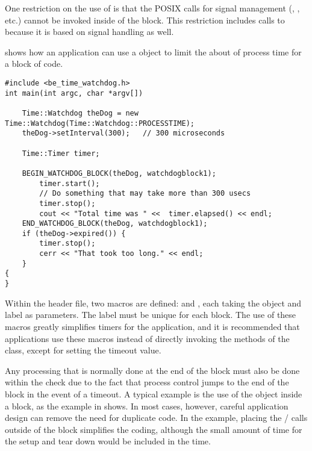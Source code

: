 One restriction on the use of  is that the POSIX calls for
signal management (, , etc.) cannot be
invoked inside of the  block. This restriction includes calls to
 because it is based on signal handling as well.

 shows how an application can use a 
object to limit the about of process time for a block of code.

\begin{lstlisting}[caption={Using the \class{Watchdog}}, label=lst:watchdoguse]
#include <be_time_watchdog.h>
int main(int argc, char *argv[])

    Time::Watchdog theDog = new Time::Watchdog(Time::Watchdog::PROCESSTIME);
    theDog->setInterval(300);	// 300 microseconds

    Time::Timer timer;

    BEGIN_WATCHDOG_BLOCK(theDog, watchdogblock1);
        timer.start();
        // Do something that may take more than 300 usecs
        timer.stop();
        cout << "Total time was " <<  timer.elapsed() << endl;
    END_WATCHDOG_BLOCK(theDog, watchdogblock1);
    if (theDog->expired()) {
        timer.stop();
        cerr << "That took too long." << endl;
    }
{
}
\end{lstlisting}

Within the  header file, two macros are defined:
 and , each taking
the  object and label as parameters. The label must be unique
for each  block.  The use of these macros greatly simplifies
 timers for the application, and it is recommended that applications
use these macros instead of directly invoking the methods of the
 class, except for setting the timeout value.

Any processing that is normally done at the end of the  block must also
be done within the  check
due to the fact that process control jumps to the end of the  block
in the event of a timeout.
A typical example is the use of the 
object inside a  block, as the example in 
shows. In most cases, however, careful application design can remove the need
for duplicate code. In the example, placing the  / calls
outside of the  block simplifies the coding, although the small amount
of time for the  setup and tear down would be included in the time.
